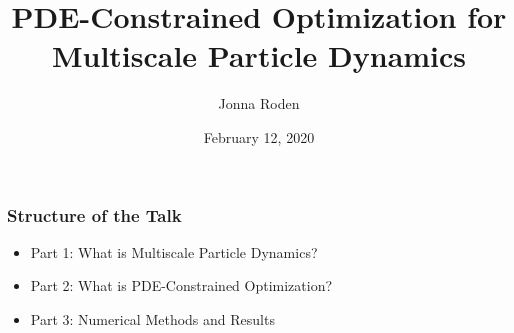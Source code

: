 \documentclass[aspectratio=169,xcolor=dvipsnames]{beamer}
\begin{document}
\title[]{PDE-Constrained Optimization for Multiscale Particle Dynamics}
\author[Jonna Roden]{Jonna Roden}
\date{February 12, 2020}

\begin{frame}
\titlepage
\end{frame}
 
 
\begin{frame}
	\frametitle{Structure of the Talk}
	 
	 \begin{itemize}
	 	\item Part 1: What is Multiscale Particle Dynamics?
	 	\item Part 2: What is PDE-Constrained Optimization?
	 	\item Part 3: Numerical Methods and Results
	 \end{itemize}
\end{frame}
\end{document}
